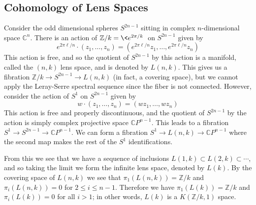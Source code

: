 \subsection{Cohomology of Lens Spaces}

Consider the odd dimensional spheres $S^{2n-1}$ sitting in complex $n$-dimensional space $\mathbb C^n$. There is an action of $\mathbb Z/k = \< e^{2\pi/k} \>$ on $S^{2n-1}$ given by
\[ e^{2\pi \ell/n} \cdot (z_1,\ldots,z_n) = (e^{2\pi \ell/n} z_1,\ldots, e^{2\pi \ell/n} z_n) \]
This action is free, and so the quotient of $S^{2n-1}$ by this action is a manifold, called the $(n,k)$ lens space, and is denoted by $L(n,k)$. This gives us a fibration $\mathbb Z/k \rightarrow S^{2n-1} \rightarrow L(n,k)$ (in fact, a covering space), but we cannot apply the Leray-Serre spectral sequence since the fiber is not connected. However, consider the action of $S^1$ on $S^{2n-1}$ given by
\[ w \cdot (z_1,\ldots,z_n) = (wz_1,\ldots,wz_n) \]
This action is free and properly discontinuous, and the quotient of $S^{2n-1}$ by the action is simply complex projective space $\mathbb CP^{n-1}$. This leads to a fibration $S^1 \rightarrow S^{2n-1} \rightarrow \mathbb CP^{n-1}$. We can form a fibration $S^1 \rightarrow L(n,k) \rightarrow \mathbb CP^{n-1}$ where the second map makes the rest of the $S^1$ identifications.

From this we see that we have a sequence of inclusions $L(1,k) \subset L(2,k) \subset \cdots$, and so taking the limit we form the infinite lens space, denoted by $L(k)$. By the covering space of $L(n,k)$ we see that $\pi_1(L(n,k)) = \mathbb Z/k$ and $\pi_i(L(n,k)) = 0$ for $2 \leq i \leq n-1$. Therefore we have $\pi_1(L(k)) = \mathbb Z/k$ and $\pi_i(L(k)) = 0$ for all $i > 1$; in other words, $L(k)$ is a $K(\mathbb Z/k,1)$ space.

